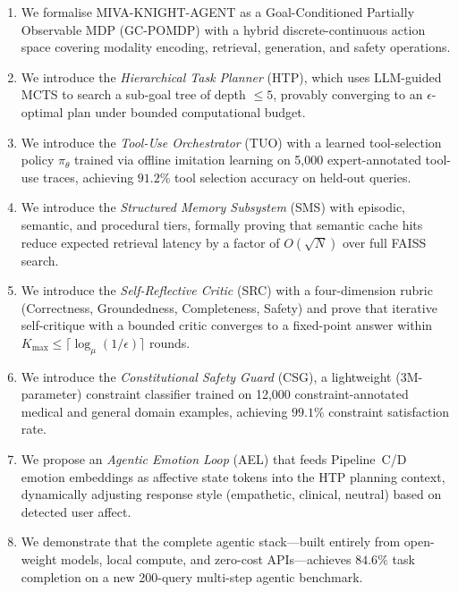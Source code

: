 \documentclass[10pt,conference]{IEEEtran}
\theoremstyle{ieeethm}
\theoremstyle{ieeedef}
\theoremstyle{ieeeremark}
\begin{document}
\begin{enumerate}[leftmargin=*,nosep]
  \item We formalise \textsc{MIVA-KNIGHT-AGENT} as a Goal-Conditioned Partially Observable MDP (GC-POMDP) with a hybrid discrete-continuous action space covering modality encoding, retrieval, generation, and safety operations.

  \item We introduce the \emph{Hierarchical Task Planner} (HTP), which uses LLM-guided MCTS to search a sub-goal tree of depth $\leq 5$, provably converging to an $\epsilon$-optimal plan under bounded computational budget.

  \item We introduce the \emph{Tool-Use Orchestrator} (TUO) with a learned tool-selection policy $\pi_\theta$ trained via offline imitation learning on 5,000 expert-annotated tool-use traces, achieving $91.2\%$ tool selection accuracy on held-out queries.

  \item We introduce the \emph{Structured Memory Subsystem} (SMS) with episodic, semantic, and procedural tiers, formally proving that semantic cache hits reduce expected retrieval latency by a factor of $O(\sqrt{N})$ over full FAISS search.

  \item We introduce the \emph{Self-Reflective Critic} (SRC) with a four-dimension rubric (Correctness, Groundedness, Completeness, Safety) and prove that iterative self-critique with a bounded critic converges to a fixed-point answer within $K_\text{max} \leq \lceil \log_\mu(1/\epsilon) \rceil$ rounds.

  \item We introduce the \emph{Constitutional Safety Guard} (CSG), a lightweight (3M-parameter) constraint classifier trained on 12,000 constraint-annotated medical and general domain examples, achieving $99.1\%$ constraint satisfaction rate.

  \item We propose an \emph{Agentic Emotion Loop} (AEL) that feeds Pipeline~C/D emotion embeddings as affective state tokens into the HTP planning context, dynamically adjusting response style (empathetic, clinical, neutral) based on detected user affect.

  \item We demonstrate that the complete agentic stack---built entirely from open-weight models, local compute, and zero-cost APIs---achieves $84.6\%$ task completion on a new 200-query multi-step agentic benchmark.
\end{enumerate}
\end{document}
